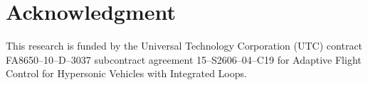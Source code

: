\documentclass[journal]{IEEEtran}
\newcommand{\bibstylepath}{../sty/IEEEtran}
\newcommand{\bibsourcepath}{../bib/ieee-access-2017}
\theoremstyle{innercustomthm}
\begin{document}
  \section*{Acknowledgment}
  This research is funded by the Universal Technology Corporation (UTC) contract FA8650--10--D--3037 subcontract agreement 15--S2606--04--C19 for Adaptive Flight Control for Hypersonic Vehicles with Integrated Loops.

  
  

  \onecolumn
  \begin{multicols}{2}
  \newpage
  \end{multicols}
\end{document}
